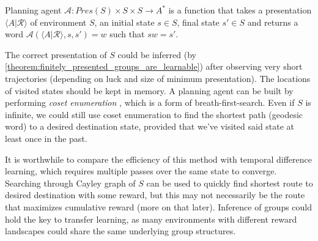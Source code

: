 \documentclass[oneside,english,logo]{amuthesis}
\begin{document}
\begin{definition}
Planning agent $\mathcal{A}:Pres(S) \times S \times S \rightarrow A^*$ is a function that takes a presentation  $\langle A \vert \mathcal{R} \rangle$ of environment $S$, an initial state $s \in S$, final state $s'\in S$ and returns a word $\mathcal{A}(\langle A \vert \mathcal{R} \rangle, s, s') = w$ such that $sw=s'$.
\end{definition}
The correct presentation of $S$ could be inferred (by \ref{theorem:finitely_presented_groups_are_learnable}) after observing very short trajectories (depending on luck and size of minimum  presentation). The locations of visited states should be kept in memory. A planning agent can be built by performing \textit{coset enumeration} \cite{johnson_1997}, which is a form of breath-first-search. Even if $S$ is infinite, we could still use coset enumeration to find the shortest path (geodesic word) to a desired destination state, provided that we've visited said state at least once in the past. 

It is worthwhile to compare the efficiency of this method with temporal difference learning, which requires multiple passes over the same state to converge. Searching through Cayley graph of $S$ can be used to quickly find shortest route to desired destination with some reward, but this may not necessarily be the route that maximizes cumulative reward (more on that later). Inference of groups could hold the key to transfer learning, as many environments with different reward landscapes could share the same underlying group structures. 
\end{document}
